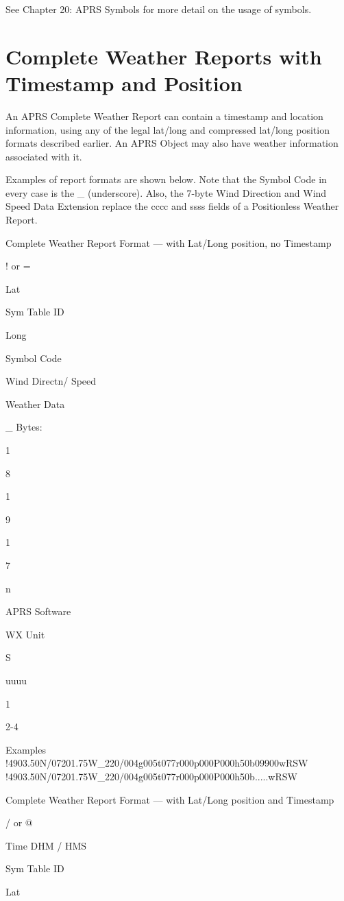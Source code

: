 See Chapter 20: APRS Symbols for more detail on the usage of symbols.

\section {Complete Weather Reports with Timestamp and Position}

An APRS Complete Weather Report can contain a timestamp and location
information, using any of the legal lat/long and compressed lat/long position
formats described earlier. An APRS Object may also have weather
information associated with it.

Examples of report formats are shown below. Note that the Symbol Code in
every case is the _ (underscore). Also, the 7-byte Wind Direction and Wind
Speed Data Extension replace the cccc and ssss fields of a Positionless
Weather Report.


Complete Weather Report Format — with Lat/Long position, no Timestamp

! or
=

Lat

Sym
Table
ID

Long

Symbol
Code

Wind
Directn/
Speed

Weather
Data

_
Bytes:

1

8

1

9

1

7

n

APRS
Software

WX
Unit

S

uuuu

1

2-4

Examples
!4903.50N/07201.75W_220/004g005t077r000p000P000h50b09900wRSW
!4903.50N/07201.75W_220/004g005t077r000p000P000h50b.....wRSW



Complete Weather Report Format — with Lat/Long position and Timestamp

/ or
@

Time
DHM /
HMS

Sym
Table
ID

Lat

